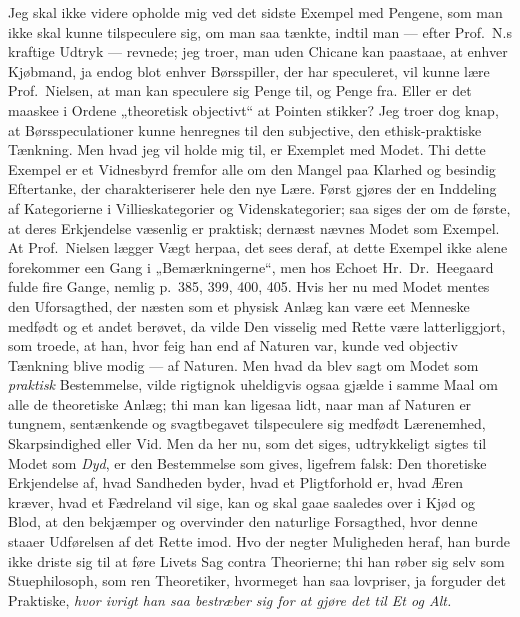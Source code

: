 Jeg skal ikke videre opholde mig ved det sidste Exempel med Pengene, som man
ikke skal kunne tilspeculere sig, om man saa tænkte, indtil man --- efter
Prof.\ N.s kraftige Udtryk --- revnede; jeg troer, man uden Chicane kan
paastaae, at enhver Kjøbmand, ja endog blot enhver Børsspiller, der har
speculeret, vil kunne lære Prof.\ Nielsen, at man kan speculere sig Penge til,
og Penge fra. Eller er det maaskee i Ordene „theoretisk objectivt“ at Pointen
stikker? Jeg troer dog knap, at Børsspeculationer kunne henregnes til den
subjective, den ethisk-praktiske Tænkning. Men hvad jeg vil holde mig til, er
Exemplet med Modet. Thi dette Exempel er et Vidnesbyrd fremfor alle om den
Mangel paa Klarhed og besindig Eftertanke, der charakteriserer hele den nye
Lære. Først gjøres der en Inddeling af Kategorierne i Villieskategorier og
Videnskategorier; saa siges der om de første, at deres Erkjendelse væsenlig er
praktisk; dernæst nævnes Modet som Exempel. At Prof.\ Nielsen lægger Vægt
herpaa, det sees deraf, at dette Exempel ikke alene forekommer een Gang i
„Bemærkningerne“, men hos Echoet Hr.\ Dr.\ Heegaard fulde fire Gange, nemlig
p.\ 385, 399, 400, 405. Hvis her nu med Modet mentes den Uforsagthed, der
næsten som et physisk Anlæg kan være eet Menneske medfødt og et andet berøvet,
da vilde Den visselig med Rette
være latterliggjort, som troede, at han, hvor feig han end af Naturen
var, kunde ved objectiv Tænkning blive modig --- af Naturen. Men hvad da blev
sagt om Modet som \emph{praktisk} Bestemmelse, vilde rigtignok uheldigvis ogsaa
gjælde i samme Maal om alle de theoretiske Anlæg; thi man kan ligesaa lidt,
naar man af Naturen er tungnem, sentænkende og svagtbegavet tilspeculere sig
medfødt Lærenemhed, Skarpsindighed eller Vid. Men da her nu, som det siges,
udtrykkeligt sigtes til Modet som \emph{Dyd}, er den Bestemmelse som gives,
ligefrem falsk: Den thoretiske Erkjendelse af, hvad Sandheden byder, hvad et
Pligtforhold er, hvad Æren kræver, hvad et Fædreland vil sige, kan og skal
gaae saaledes over i Kjød og Blod, at den bekjæmper og overvinder den naturlige
Forsagthed, hvor denne staaer Udførelsen af det Rette imod. Hvo der negter
Muligheden heraf, han burde ikke driste sig til at føre Livets Sag contra
Theorierne; thi han røber sig selv som Stuephilosoph, som ren Theoretiker,
hvormeget han saa lovpriser, ja forguder det Praktiske, \emph{hvor ivrigt han
saa bestræber sig for at gjøre det til Et og Alt.}

